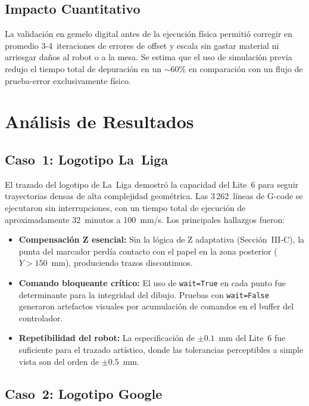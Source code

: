 \documentclass[journal,compsoc]{IEEEtran}
\begin{document}
\subsection{Impacto Cuantitativo}

La validación en gemelo digital antes de la ejecución física permitió corregir en promedio 3-4~iteraciones de errores de offset y escala sin gastar material ni arriesgar daños al robot o a la mesa. Se estima que el uso de simulación previa redujo el tiempo total de depuración en un $\sim 60\%$ en comparación con un flujo de prueba-error exclusivamente físico.

\section{Análisis de Resultados}

\subsection{Caso~1: Logotipo La~Liga}

El trazado del logotipo de La~Liga demostró la capacidad del Lite~6 para seguir trayectorias densas de alta complejidad geométrica. Las 3\,262~líneas de G-code se ejecutaron sin interrupciones, con un tiempo total de ejecución de aproximadamente 32~minutos a 100~mm/s. Los principales hallazgos fueron:

\begin{itemize}
    \item \textbf{Compensación Z esencial:} Sin la lógica de Z adaptativa (Sección~III-C), la punta del marcador perdía contacto con el papel en la zona posterior ($Y > 150$~mm), produciendo trazos discontinuos.
    \item \textbf{Comando bloqueante crítico:} El uso de \texttt{wait=True} en cada punto fue determinante para la integridad del dibujo. Pruebas con \texttt{wait=False} generaron artefactos visuales por acumulación de comandos en el buffer del controlador.
    \item \textbf{Repetibilidad del robot:} La especificación de $\pm 0.1$~mm del Lite~6 fue suficiente para el trazado artístico, donde las tolerancias perceptibles a simple vista son del orden de $\pm 0.5$~mm.
\end{itemize}

\subsection{Caso~2: Logotipo Google}
\end{document}
